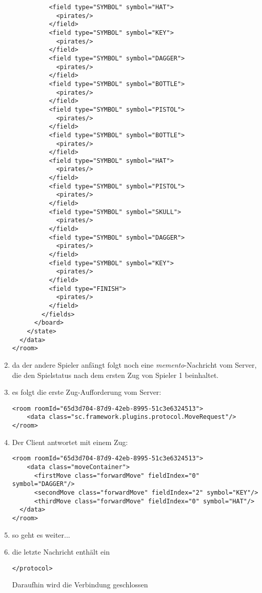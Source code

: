 \documentclass[12pt,a4paper, ngerman, oneside]{scrartcl}
\begin{document}
\begin{enumerate}
\begin{verbatim}
          <field type="SYMBOL" symbol="HAT">
            <pirates/>
          </field>
          <field type="SYMBOL" symbol="KEY">
            <pirates/>
          </field>
          <field type="SYMBOL" symbol="DAGGER">
            <pirates/>
          </field>
          <field type="SYMBOL" symbol="BOTTLE">
            <pirates/>
          </field>
          <field type="SYMBOL" symbol="PISTOL">
            <pirates/>
          </field>
          <field type="SYMBOL" symbol="BOTTLE">
            <pirates/>
          </field>
          <field type="SYMBOL" symbol="HAT">
            <pirates/>
          </field>
          <field type="SYMBOL" symbol="PISTOL">
            <pirates/>
          </field>
          <field type="SYMBOL" symbol="SKULL">
            <pirates/>
          </field>
          <field type="SYMBOL" symbol="DAGGER">
            <pirates/>
          </field>
          <field type="SYMBOL" symbol="KEY">
            <pirates/>
          </field>
          <field type="FINISH">
            <pirates/>
          </field>
        </fields>
      </board>
    </state>
  </data>
</room>
\end{verbatim}
\item da der andere Spieler anfängt folgt noch eine \textit{memento}-Nachricht vom Server, die den Spielstatus nach dem ersten Zug von Spieler 1 beinhaltet.
\item es folgt die erste Zug-Aufforderung vom Server: \begin{verbatim}
<room roomId="65d3d704-87d9-42eb-8995-51c3e6324513">
    <data class="sc.framework.plugins.protocol.MoveRequest"/>
</room>
\end{verbatim}
\item Der Client antwortet mit einem Zug: \begin{verbatim}
<room roomId="65d3d704-87d9-42eb-8995-51c3e6324513">
    <data class="moveContainer">
      <firstMove class="forwardMove" fieldIndex="0" symbol="DAGGER"/>
      <secondMove class="forwardMove" fieldIndex="2" symbol="KEY"/>
      <thirdMove class="forwardMove" fieldIndex="0" symbol="HAT"/>
  </data>
</room>
\end{verbatim}
\item so geht es weiter...
\item die letzte Nachricht enthält ein \begin{verbatim}
</protocol>
\end{verbatim}
Daraufhin wird die Verbindung geschlossen
\end{enumerate}
\end{document}
